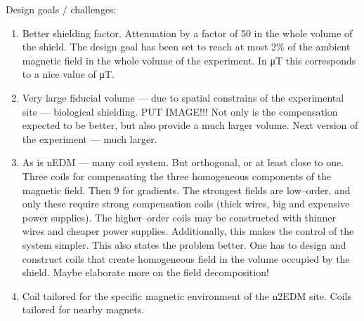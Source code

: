 Design goals / challenges:
\begin{enumerate}
  \item Better shielding factor. Attenuation by a factor of 50 in the whole volume of the shield. The design goal has been set to reach at most 2\% of the ambient magnetic field in the
  whole volume of the experiment. In \unit[50]{\micro T} this corresponds to a nice value of \unit[1]{\micro T}.
  \item Very large fiducial volume --- due to spatial constrains of the experimental site --- biological shielding. PUT IMAGE!!! Not only is the compensation expected to be better, but also provide a much larger volume. Next version of the experiment --- much larger.
  \item As is nEDM --- many coil system. But orthogonal, or at least close to one. Three coils for compensating the three homogeneous components of the magnetic field. Then 9 for gradients. The strongest fields are low--order, and only these require strong compensation coils (thick wires, big and expensive power supplies). The higher--order coils may be constructed with thinner wires and cheaper power supplies.
  Additionally, this makes the control of the system simpler.
  This also states the problem better. One has to design and construct coils that create homogeneous field in the volume occupied by the shield. Maybe elaborate more on the field decomposition!
  \item Coil tailored for the specific magnetic environment of the n2EDM site. Coils tailored for nearby magnets.
\end{enumerate}
